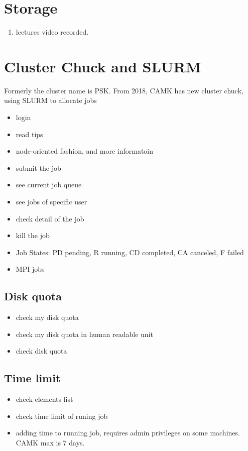 \section{Storage}
\begin{enumerate}
\item{} lectures video recorded.
\end{enumerate}

\section{Cluster Chuck and SLURM}
Formerly the cluster name is PSK. From 2018, CAMK has new cluster chuck, using SLURM to allocate jobs

\begin{itemize}
\itemsep0em
\item {} login
\item {} read tips 
\item {} node-oriented fashion, and more informatoin
\item {} submit the job
\item {} see current job queue
\item {} see jobs of specific user
\item {} check detail of the job
\item {} kill the job
\item Job States: PD pending, R running, CD completed, CA canceled, F failed
\item MPI jobs
\end{itemize}


\subsection{Disk quota}
\begin{itemize}
\item {} check my disk quota
\item {} check my disk quota in human readable unit
\item {} check disk quota
\end{itemize}

\subsection{Time limit}
\begin{itemize}
\item {} check elements list
\item {} check time limit of runing job
\item {} adding time to running job, requires admin privileges on some machines. CAMK max is 7 days.
\end{itemize}


